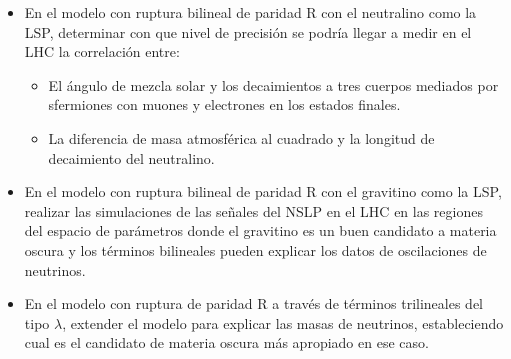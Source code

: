 \begin{itemize}
\item 
\begin{proyecto}
  En el modelo con ruptura bilineal de paridad R con el neutralino como la LSP, determinar con
  que nivel de precisión se podría llegar a medir en el LHC la correlación entre:
  \begin{itemize}
  \item El ángulo de mezcla solar y los decaimientos a tres cuerpos mediados
    por sfermiones con muones y electrones en los estados finales.
  \item La diferencia de masa atmosférica al cuadrado y la longitud de
    decaimiento del neutralino.
  \end{itemize}
\end{proyecto}

\item 
\begin{proyecto}
  En el modelo con ruptura bilineal de paridad R con el gravitino como
  la LSP, realizar las simulaciones de las señales del NSLP en el LHC
  en las regiones del espacio de parámetros donde el gravitino es un
  buen candidato a materia oscura y los términos bilineales pueden
  explicar los datos de oscilaciones de neutrinos.
\end{proyecto}

\item 
\begin{proyecto}
  En el modelo con ruptura de paridad R a través de términos
  trilineales del tipo $\lambda$, extender el modelo para explicar las
  masas de neutrinos, estableciendo cual es el candidato de materia
  oscura más apropiado en ese caso.
\end{proyecto}



\end{itemize}


